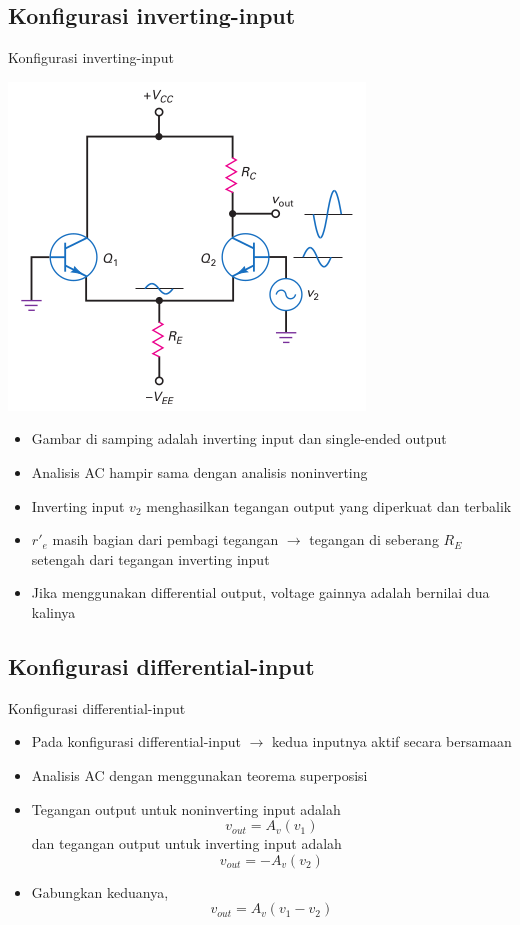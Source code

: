 \documentclass[aspectratio=169]{beamer}
\begin{document}
\subsection{Konfigurasi inverting-input}
\begin{frame}{Konfigurasi inverting-input}
	\begin{multicols}{2}
		\begin{center}
			\includegraphics[height=0.7\textheight]{gambar/01.inverting_input_+single-ended_output}
		\end{center}
		\columnbreak
		\begin{itemize}
			\item Gambar di samping adalah inverting input dan single-ended output
			\item Analisis AC hampir sama dengan analisis noninverting
			\item Inverting input $ v_2 $ menghasilkan tegangan output yang diperkuat dan terbalik
			\item $ r'_e $ masih bagian dari pembagi tegangan $ \rightarrow $ tegangan di seberang $ R_E $ setengah dari tegangan inverting input
			\item Jika menggunakan differential output, voltage gainnya adalah bernilai dua kalinya
		\end{itemize}
	\end{multicols}
\end{frame}

\subsection{Konfigurasi differential-input}
\begin{frame}{Konfigurasi differential-input}
	\begin{itemize}
		\item Pada konfigurasi differential-input $ \rightarrow $ kedua inputnya aktif secara bersamaan
		\item Analisis AC dengan menggunakan teorema superposisi
		\item Tegangan output untuk noninverting input adalah $$ v_{out} = A_v(v_1) $$ dan tegangan output untuk inverting input adalah $$ v_{out} = -A_v (v_2) $$
		\item Gabungkan keduanya, $$ v_{out} = A_v (v_1 - v_2) $$
	\end{itemize}
\end{frame}
\end{document}
